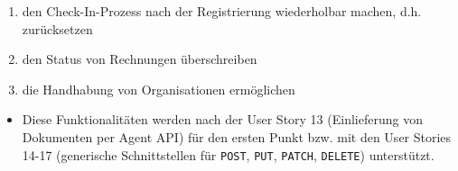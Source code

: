 \begin{itemize}
\begin{enumerate}
            \item den Check-In-Prozess nach der Registrierung wiederholbar machen, d.h. zurücksetzen
            \item den Status von Rechnungen überschreiben
            \item die Handhabung von Organisationen ermöglichen
        \end{enumerate}
        \begin{itemize}
            \item Diese Funktionalitäten werden nach der User Story 13 (Einlieferung von Dokumenten per Agent API) für den ersten Punkt bzw. mit den User Stories 14-17 (generische Schnittstellen für \texttt{POST}, \texttt{PUT}, \texttt{PATCH}, \texttt{DELETE}) unterstützt.
        \end{itemize}
\end{itemize}
